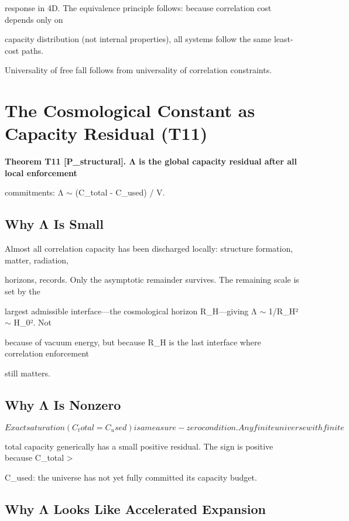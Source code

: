 \documentclass[11pt]{article}
\begin{document}
response in 4D. The equivalence principle follows: because correlation cost depends only on

capacity distribution (not internal properties), all systems follow the same least-cost paths.



Universality of free fall follows from universality of correlation constraints.



\section{The Cosmological Constant as Capacity Residual (T11)}

\textbf{Theorem T11 [P_structural]. Λ is the global capacity residual after all local enforcement}

commitments: Λ $\sim$ (C_total - C_used) / V.



\subsection{Why Λ Is Small}

Almost all correlation capacity has been discharged locally: structure formation, matter, radiation,

horizons, records. Only the asymptotic remainder survives. The remaining scale is set by the

largest admissible interface---the cosmological horizon R_H---giving Λ $\sim$ 1/R_H² $\sim$ H_0². Not

because of vacuum energy, but because R_H is the last interface where correlation enforcement

still matters.



\subsection{Why Λ Is Nonzero}

\[Exact saturation (C_total = C_used) is a measure-zero condition. Any finite universe with finite\]

total capacity generically has a small positive residual. The sign is positive because C_total >

C_used: the universe has not yet fully committed its capacity budget.



\subsection{Why Λ Looks Like Accelerated Expansion}
\end{document}
